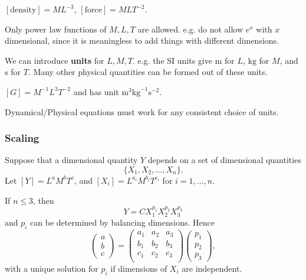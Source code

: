 \begin{example}
    $ [\text{density}]=ML^{-3} $, $ [\text{force}]=MLT^{-2} $.
\end{example}
\begin{note}
    Only power law functions of $M,L,T$ are allowed. e.g. do not allow $e^x$ with $x$ dimensional, since it is meaningless to add things with different dimensions.
\end{note}

We can introduce \textbf{units} for $L,M,T$. e.g. the SI units give $ \mathrm{m} $ for $L$, $ \mathrm{kg} $ for $M$, and $\mathrm{s}$ for $T$. Many other physical quantities can be formed out of these units.
\begin{example}
    $ [G]=M^{-1}L^3T^{-2} $ and has unit $ \mathrm{m}^3 \mathrm{kg}^{-1}\mathrm{s}^{-2} $.
\end{example}

\begin{law}
    Dynamical/Physical equations must work for any consistent choice of units.
\end{law}

\subsubsection*{Scaling}

Suppose that a dimensional quantity $ Y $ depends on a set of dimensional quantities
\[
    \{X_1,X_2,\dots,X_n\}.
\]
Let $ [Y]=L^aM^bT^c $, and $ [X_i]=L^{a_i}M^{b_i}T^{c_i} $ for $i=1,\dots,n$. 

If $n\le 3$, then 
\[
    Y = C X_1^{p_1}X_2^{p_2}X_3^{p_3}
\]
and $p_i$ can be determined by balancing dimensions. Hence
\[
    \begin{pmatrix}
        a \\ b \\ c
    \end{pmatrix}=\begin{pmatrix}
        a_1 & a_2 & a_3 \\
        b_1 & b_2 & b_3 \\
        c_1 & c_2 & c_3 \\
    \end{pmatrix}\begin{pmatrix}
        p_1 \\ p_2 \\ p_3
    \end{pmatrix},
\]
with a unique solution for $p_i$ if dimensions of $X_i$ are independent.

